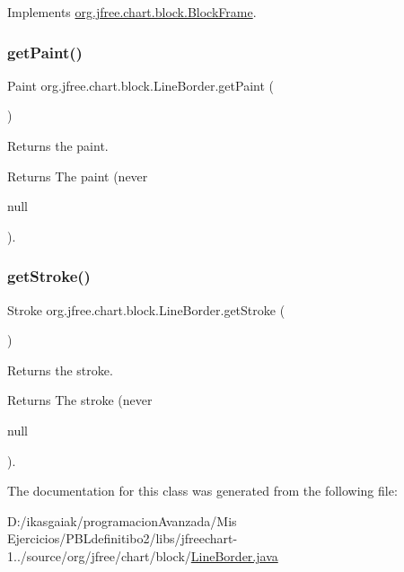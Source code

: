 Implements \mbox{\hyperlink{interfaceorg_1_1jfree_1_1chart_1_1block_1_1_block_frame_ae85aa6f391781ca53ae5b4671b6d1154}{org.\+jfree.\+chart.\+block.\+Block\+Frame}}.

\mbox{\label{classorg_1_1jfree_1_1chart_1_1block_1_1_line_border_ae3527e582df30cc180cd066d71787d57}} 
\subsubsection{\texorpdfstring{get\+Paint()}{getPaint()}}
{\footnotesize\ttfamily Paint org.\+jfree.\+chart.\+block.\+Line\+Border.\+get\+Paint (\begin{DoxyParamCaption}{ }\end{DoxyParamCaption})}

Returns the paint.

\begin{DoxyReturn}{Returns}
The paint (never
\begin{DoxyCode}
null 
\end{DoxyCode}
 ). 
\end{DoxyReturn}
\mbox{\label{classorg_1_1jfree_1_1chart_1_1block_1_1_line_border_acaf4b7558fe9757dca4047f8c554408f}} 
\subsubsection{\texorpdfstring{get\+Stroke()}{getStroke()}}
{\footnotesize\ttfamily Stroke org.\+jfree.\+chart.\+block.\+Line\+Border.\+get\+Stroke (\begin{DoxyParamCaption}{ }\end{DoxyParamCaption})}

Returns the stroke.

\begin{DoxyReturn}{Returns}
The stroke (never
\begin{DoxyCode}
null 
\end{DoxyCode}
 ). 
\end{DoxyReturn}


The documentation for this class was generated from the following file\+:\begin{DoxyCompactItemize}
\item 
D\+:/ikasgaiak/programacion\+Avanzada/\+Mis Ejercicios/\+P\+B\+Ldefinitibo2/libs/jfreechart-\/1../source/org/jfree/chart/block/\mbox{\hyperlink{_line_border_8java}{Line\+Border.\+java}}\end{DoxyCompactItemize}
